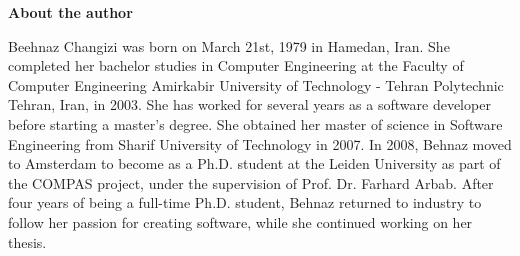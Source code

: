 \newpage
{\textbf{\Large{About the author}}}
\vspace*{1cm}

Beehnaz Changizi was born on March 21st, 1979 in Hamedan, Iran. She completed
her bachelor studies in Computer Engineering at the Faculty of Computer Engineering Amirkabir University of Technology - Tehran Polytechnic Tehran, Iran, in 2003. She has worked for several years as a software developer before starting a master's degree. She obtained her master of science in Software Engineering from Sharif University of Technology in 2007.
In 2008, Behnaz moved to Amsterdam to become as a Ph.D. student at the
Leiden University as part of the COMPAS project, under the supervision of Prof. Dr. Farhard Arbab. After four years of being a full-time Ph.D. student, Behnaz returned to industry to follow her passion for creating software, while she continued working on her thesis.
